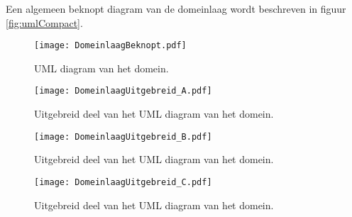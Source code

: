 \label{bijlagen}
Een algemeen beknopt diagram van de domeinlaag wordt beschreven in figuur \ref{fig:umlCompact}.
\begin{figure}[h!]
\texttt{[image: DomeinlaagBeknopt.pdf]}
\caption{UML diagram van het domein.}
\label{fig:umlCompact}
\label{fig:DomeinlaagBeknopt}
\end{figure}

\begin{figure}
  \texttt{[image: DomeinlaagUitgebreid\_A.pdf]}
  \caption{Uitgebreid deel van het UML diagram van het domein.}
\end{figure}

\begin{figure}
  \texttt{[image: DomeinlaagUitgebreid\_B.pdf]}
  \caption{Uitgebreid deel van het UML diagram van het domein.}
\end{figure}

\begin{figure}
  \texttt{[image: DomeinlaagUitgebreid\_C.pdf]}
  \caption{Uitgebreid deel van het UML diagram van het domein.}
\end{figure}

\begin{figure}[h!]

\end{figure}

\begin{figure}
\end{figure}


\begin{figure}
\end{figure}

\begin{figure}

\end{figure}

